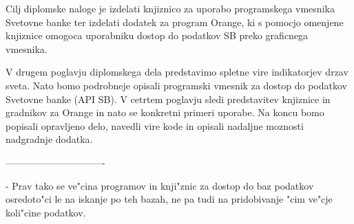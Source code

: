 Cilj diplomske naloge je izdelati knjiznico za uporabo programskega vmesnika
Svetovne banke ter izdelati dodatek za program Orange, ki s pomocjo omenjene
knjiznice omogoca uporabniku dostop do podatkov SB preko graficnega vmesnika.


V drugem poglavju diplomskega dela predstavimo spletne vire indikatorjev
drzav sveta. Nato bomo podrobneje opisali programski vmesnik za dostop do 
podatkov Svetovne banke (API SB). V cetrtem poglavju sledi predstavitev 
knjiznice in gradnikov za Orange in nato se konkretni primeri uporabe. Na koncu
bomo popisali opravljeno delo, navedli vire kode in opisali nadaljne moznosti
nadgradnje dodatka.










                                                                                
                                                                                
                         

-------------------------------

 - Prav tako se ve"cina programov in knji"znic za dostop do baz podatkov osredoto"ci le na iskanje po teh bazah, ne pa tudi na pridobivanje "cim ve"cje koli"cine podatkov.                                    
                                                                                

                                                                                

